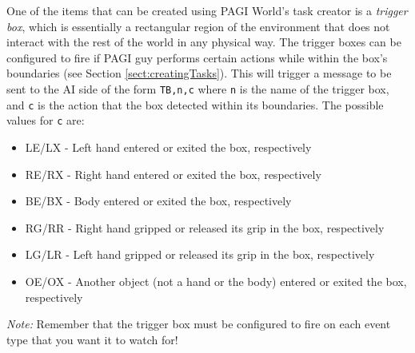 One of the items that can be created using PAGI World's task creator is a \textit{trigger box}, which is essentially a rectangular region of the environment that does not interact with the rest of the world in any physical way. The trigger boxes can be configured to fire if PAGI guy performs certain actions while within the box's boundaries (see Section \ref{sect:creatingTasks}). This will trigger a message to be sent to the AI side of the form \texttt{TB,n,c} where \texttt{n} is the name of the trigger box, and \texttt{c} is the action that the box detected within its boundaries. The possible values for \texttt{c} are:

\begin{itemize}
\item{LE/LX} - Left hand entered or exited the box, respectively
\item{RE/RX} - Right hand entered or exited the box, respectively
\item{BE/BX} - Body entered or exited the box, respectively
\item{RG/RR} - Right hand gripped or released its grip in the box, respectively
\item{LG/LR} - Left hand gripped or released its grip in the box, respectively
\item{OE/OX} - Another object (not a hand or the body) entered or exited the box, respectively
\end{itemize}

\textit{Note:} Remember that the trigger box must be configured to fire on each event type that you want it to watch for!
	
